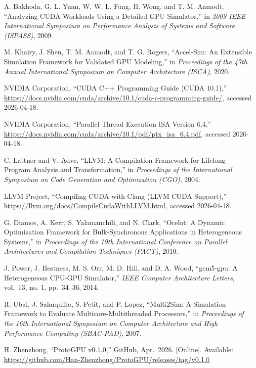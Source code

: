 \documentclass[11pt]{article}
\begin{document}
\begin{enumerate}[label={[\arabic*]}]
\item
  A. Bakhoda, G. L. Yuan, W. W. L. Fung, H. Wong, and T. M. Aamodt,
  ``Analyzing CUDA Workloads Using a Detailed GPU Simulator,'' in
  \emph{2009 IEEE International Symposium on Performance Analysis of
  Systems and Software (ISPASS)}, 2009.
\item
  M. Khairy, J. Shen, T. M. Aamodt, and T. G. Rogers, ``Accel-Sim: An
  Extensible Simulation Framework for Validated GPU Modeling,'' in
  \emph{Proceedings of the 47th Annual International Symposium on
  Computer Architecture (ISCA)}, 2020.
\item
  NVIDIA Corporation, ``CUDA C++ Programming Guide (CUDA 10.1),''
  \url{https://docs.nvidia.com/cuda/archive/10.1/cuda-c-programming-guide/},
  accessed 2026-04-18.
\item
  NVIDIA Corporation, ``Parallel Thread Execution ISA Version 6.4,''
  \url{https://docs.nvidia.com/cuda/archive/10.1/pdf/ptx_isa_6.4.pdf},
  accessed 2026-04-18.
\item
  C. Lattner and V. Adve, ``LLVM: A Compilation Framework for Lifelong
  Program Analysis and Transformation,'' in \emph{Proceedings of the
  International Symposium on Code Generation and Optimization (CGO)},
  2004.
\item
  LLVM Project, ``Compiling CUDA with Clang (LLVM CUDA Support),''
  \url{https://llvm.org/docs/CompileCudaWithLLVM.html}, accessed 2026-04-18.
\item
  G. Diamos, A. Kerr, S. Yalamanchili, and N. Clark, ``Ocelot: A Dynamic
  Optimization Framework for Bulk-Synchronous Applications in
  Heterogeneous Systems,'' in \emph{Proceedings of the 19th
  International Conference on Parallel Architectures and Compilation
  Techniques (PACT)}, 2010.
\item
  J. Power, J. Hestness, M. S. Orr, M. D. Hill, and D. A. Wood,
  ``gem5-gpu: A Heterogeneous CPU-GPU Simulator,'' \emph{IEEE Computer
  Architecture Letters}, vol.~13, no. 1, pp.~34--36, 2014.
\item
  R. Ubal, J. Sahuquillo, S. Petit, and P. Lopez, ``Multi2Sim: A
  Simulation Framework to Evaluate Multicore-Multithreaded Processors,''
  in \emph{Proceedings of the 16th International Symposium on Computer
  Architecture and High Performance Computing (SBAC-PAD)}, 2007.
\item
  H. Zhenzhong, ``ProtoGPU v0.1.0,'' GitHub, Apr.~2026. [Online].
  Available:
  \url{https://github.com/Han-Zhenzhong/ProtoGPU/releases/tag/v0.1.0}
\end{enumerate}
\end{document}
